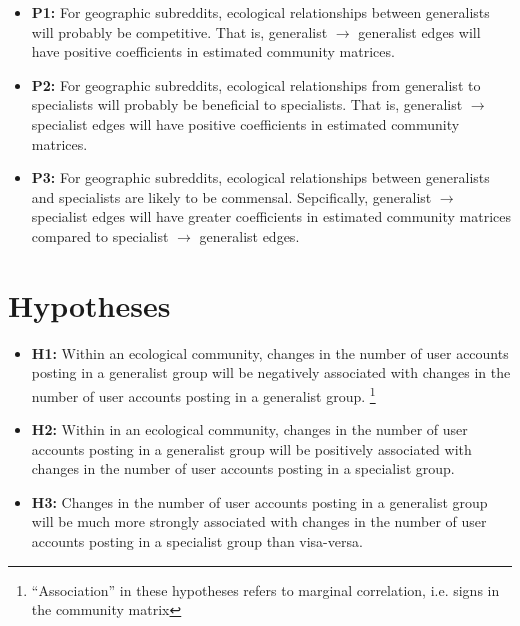 \documentclass[12pt]{memoir}
\begin{document}
\begin{itemize}
\item \textbf{P1:} For geographic subreddits, ecological relationships between generalists will probably be competitive. That is, generalist $\rightarrow$ generalist edges will have positive coefficients in estimated community matrices. 

\item \textbf{P2:} For geographic subreddits, ecological relationships from generalist to specialists will probably be beneficial to specialists. That is, generalist $\rightarrow$ specialist edges will have positive coefficients in estimated community matrices.

\item \textbf{P3:} For geographic subreddits, ecological relationships between generalists and specialists are likely to be commensal. Sepcifically, generalist $\rightarrow$ specialist edges will have greater coefficients in estimated community matrices compared to specialist $\rightarrow$ generalist edges. 

\end{itemize}

\section{Hypotheses}
\begin{itemize}

\item \textbf{H1:} Within an ecological community, changes in the number of user accounts posting in a generalist group will be negatively associated with changes in the number of user accounts posting in a generalist group.  \footnote{``Association'' in these hypotheses refers to marginal correlation, i.e. signs in the community matrix}

\item \textbf{H2:} Within in an ecological community, changes in the number of user accounts posting in a generalist group will be positively associated with changes in the number of user accounts posting in a specialist group.

\item \textbf{H3:} Changes in the number of user accounts posting in a generalist group will be much more strongly associated with changes in the number of user accounts posting in a specialist group than visa-versa.

\end{itemize}
\end{document}
